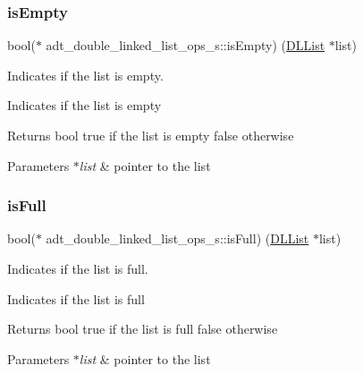 \subsubsection{\texorpdfstring{is\+Empty}{isEmpty}}
{\footnotesize\ttfamily bool($\ast$ adt\+\_\+double\+\_\+linked\+\_\+list\+\_\+ops\+\_\+s\+::is\+Empty) (\hyperlink{structadt__double__linked__list__s}{D\+L\+List} $\ast$list)}



Indicates if the list is empty. 

Indicates if the list is empty

\begin{DoxyReturn}{Returns}
bool true if the list is empty false otherwise 
\end{DoxyReturn}

\begin{DoxyParams}{Parameters}
{\em $\ast$list} & pointer to the list \\
\hline
\end{DoxyParams}
\mbox{\label{structadt__double__linked__list__ops__s_a156c7c3f087975a75273c9bc333f2946}} 
\subsubsection{\texorpdfstring{is\+Full}{isFull}}
{\footnotesize\ttfamily bool($\ast$ adt\+\_\+double\+\_\+linked\+\_\+list\+\_\+ops\+\_\+s\+::is\+Full) (\hyperlink{structadt__double__linked__list__s}{D\+L\+List} $\ast$list)}



Indicates if the list is full. 

Indicates if the list is full

\begin{DoxyReturn}{Returns}
bool true if the list is full false otherwise 
\end{DoxyReturn}

\begin{DoxyParams}{Parameters}
{\em $\ast$list} & pointer to the list \\
\hline
\end{DoxyParams}
\mbox{\label{structadt__double__linked__list__ops__s_af88ef2562862184f13eb7964a2cfd4ab}} 
